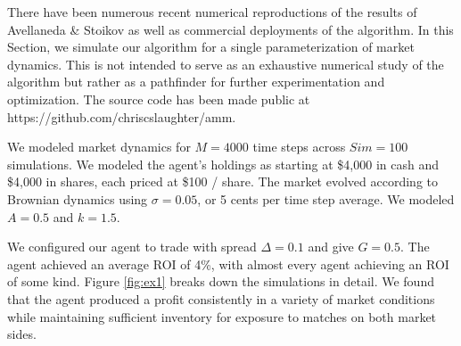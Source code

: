 \documentclass{article}
\begin{document}
There have been numerous recent numerical reproductions of the results of Avellaneda \& Stoikov \cite{fushimi2018optimal} as well as commercial deployments of the algorithm. In this Section, we simulate our algorithm for a single parameterization of market dynamics. This is not intended to serve as an exhaustive numerical study of the algorithm but rather as a pathfinder for further experimentation and optimization. The source code has been made public at https://github.com/chriscslaughter/amm.

We modeled market dynamics for $M=4000$ time steps across $Sim = 100$ simulations. We modeled the agent's holdings as starting at \$4,000 in cash and \$4,000 in shares, each priced at \$100 / share. The market evolved according to Brownian dynamics using $\sigma = 0.05$, or 5 cents per time step average. We modeled $A = 0.5$ and $k = 1.5$.

We configured our agent to trade with spread $\Delta = 0.1$ and give $G = 0.5$. The agent achieved an average ROI of 4\%, with almost every agent achieving an ROI of some kind. Figure \ref{fig:ex1} breaks down the simulations in detail. We found that the agent produced a profit consistently in a variety of market conditions while maintaining sufficient inventory for exposure to matches on both market sides.
\end{document}
